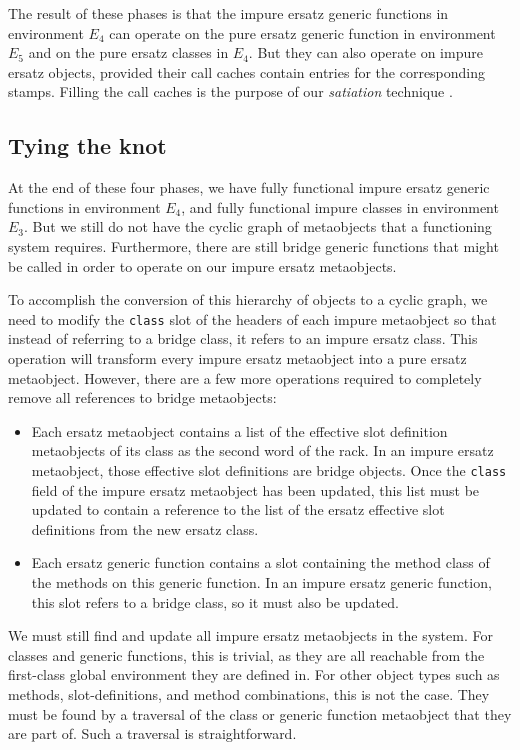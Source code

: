 The result of these phases is that the impure ersatz generic functions
in environment $E_4$ can operate on the pure ersatz generic function
in environment $E_5$ and on the pure ersatz classes in $E_4$.  But
they can also operate on impure ersatz objects, provided their call
caches contain entries for the corresponding stamps.  Filling the call
caches is the purpose of our \emph{satiation} technique
\cite{Strandh:2014:RMI:2635648.2635656}.

\subsection{Tying the knot}

At the end of these four phases, we have fully functional impure ersatz
generic functions in environment $E_4$, and fully functional impure
classes in environment $E_3$.  But we still do not have the cyclic graph
of metaobjects that a functioning \clos{} system requires.
Furthermore, there are still bridge generic functions
that might be called in order to operate on our impure ersatz
metaobjects.

To accomplish the conversion of this hierarchy of objects to a cyclic
graph, we need to modify the \texttt{class} slot of the headers of
each impure metaobject so that instead of referring to a bridge class,
it refers to an impure ersatz class.  This operation will transform
every impure ersatz metaobject into a pure ersatz metaobject.
However, there are a few more operations required to completely remove
all references to bridge metaobjects:

\begin{itemize}
\item Each ersatz metaobject contains a list of the effective slot
  definition metaobjects of its class as the second word of the rack.
  In an impure ersatz metaobject, those effective slot definitions are
  bridge objects.  Once the \texttt{class} field of the impure ersatz
  metaobject has been updated, this list must be updated to contain a
  reference to the list of the ersatz effective slot definitions from
  the new ersatz class.
\item Each ersatz generic function contains a slot containing the
  method class of the methods on this generic function.  In an impure
  ersatz generic function, this slot refers to a bridge class, so it
  must also be updated.
\end{itemize}

We must still find and update all impure ersatz metaobjects in the
system.  For classes and generic functions, this is trivial, as they
are all reachable from the first-class global environment they are
defined in.  For other object types such as methods, slot-definitions,
and method combinations, this is not the case.  They must be found by
a traversal of the class or generic function metaobject that they are
part of.  Such a traversal is straightforward.

